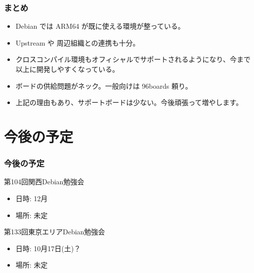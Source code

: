 \documentclass[cjk,dvipdfmx,10pt,compress,%
hyperref={bookmarks=true,bookmarksnumbered=true,bookmarksopen=false,%
colorlinks=false,%
pdftitle={第 103 回 関西 Debian 勉強会},%
pdfauthor={岩松 信洋},%
pdfsubject={資料},%
}]{beamer}
\begin{document}
\begin{frame}[fragile]
  \frametitle{まとめ}
  \begin{itemize}
  \item Debian では ARM64 が既に使える環境が整っている。
  \item Upstream や 周辺組織との連携も十分。
  \item クロスコンパイル環境もオフィシャルでサポートされるようになり、今まで以上に開発しやすくなっている。
  \item ボードの供給問題がネック。一般向けは 96boards 頼り。
  \item 上記の理由もあり、サポートボードは少ない。今後頑張って増やします。
  \end{itemize}
\end{frame}

%
%


\section{今後の予定}
\begin{frame}[fragile]
\frametitle{今後の予定}

\begin{block}{第104回関西Debian勉強会}
  \begin{itemize}
  \item 日時: 12月
  \item 場所: 未定
  \end{itemize}
\end{block}

\begin{block}{第133回東京エリアDebian勉強会}
  \begin{itemize}
  \item 日時: 10月17日(土)？
  \item 場所: 未定
  \end{itemize}
\end{block}

\end{frame}
\end{document}
